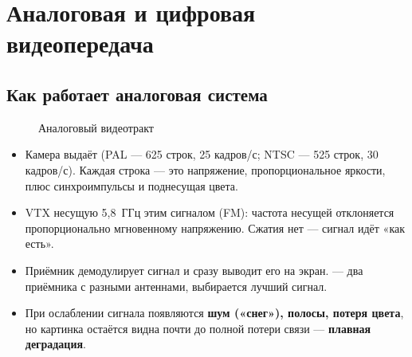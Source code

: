 \section{Аналоговая и цифровая видеопередача}

\subsection{Как работает аналоговая система}
\begin{figure}[H]\centering
{}
\caption{Аналоговый видеотракт}
\end{figure}

\begin{itemize}
\item Камера выдаёт  (PAL — 625 строк, 25 кадров/с; NTSC — 525 строк, 30 кадров/с). Каждая строка — это напряжение, пропорциональное яркости, плюс синхроимпульсы и поднесущая цвета.
\item VTX  несущую 5,8~ГГц этим сигналом (FM): частота несущей отклоняется пропорционально мгновенному напряжению. Сжатия нет — сигнал идёт «как есть».
\item Приёмник демодулирует сигнал и сразу выводит его на экран.  — два приёмника с разными антеннами, выбирается лучший сигнал.
\item При ослаблении сигнала появляются \textbf{шум («снег»), полосы, потеря цвета}, но картинка остаётся видна почти до полной потери связи — \textbf{плавная деградация}.
\end{itemize}

